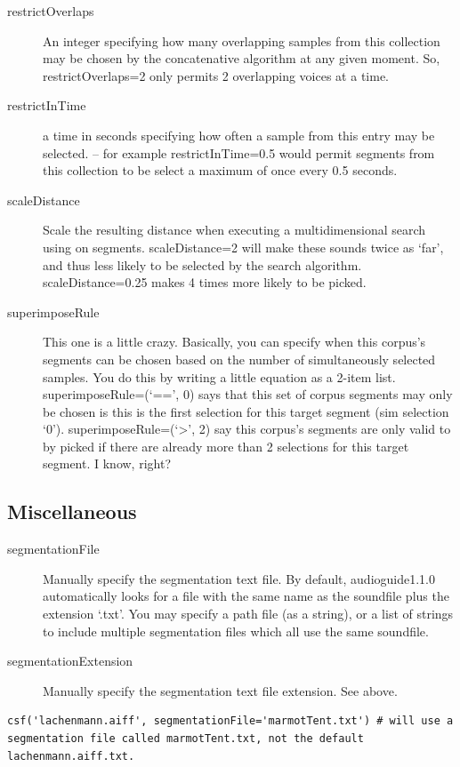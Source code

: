 \documentclass{article}
\newcommand{\ag}{audioguide1.1.0\xspace}
\begin{document}
\begin{spacing}{1.2}
\begin{description}
\item[restrictOverlaps] An integer specifying how many overlapping samples from this collection may be chosen by the concatenative algorithm at any given moment.  So, restrictOverlaps=2 only permits 2 overlapping voices at a time.

\item[restrictInTime] a time in seconds specifying how often a sample from this entry may be selected. -- for example restrictInTime=0.5 would permit segments from this collection to be select a maximum of once every 0.5 seconds.

\item[scaleDistance] Scale the resulting distance when executing a multidimensional search using on segments.  scaleDistance=2 will make these sounds twice as `far', and thus less likely to be selected by the search algorithm.  scaleDistance=0.25 makes 4 times more likely to be picked.

\item[superimposeRule]  This one is a little crazy.  Basically, you can specify when this corpus's segments can be chosen based on the number of simultaneously selected samples.  You do this by writing a little equation as a 2-item list.  superimposeRule=(`==', 0) says that this set of corpus segments may only be chosen is this is the first selection for this target segment (sim selection `0').  superimposeRule=(`>', 2) say this corpus's segments are only valid to by picked if there are already more than 2 selections for this target segment.  I know, right?
\end{description}


\subsection{Miscellaneous}
\begin{description}
\item[segmentationFile] Manually specify the segmentation text file. By default, \ag automatically looks for a file with the same name as the soundfile plus the extension `.txt'. You may specify a path file (as a string), or a list of strings to include multiple segmentation files which all use the same soundfile.

\item[segmentationExtension] Manually specify the segmentation text file extension.  See above.
\end{description}

\begin{lstlisting}
csf('lachenmann.aiff', segmentationFile='marmotTent.txt') # will use a segmentation file called marmotTent.txt, not the default lachenmann.aiff.txt.


\end{lstlisting}
\end{spacing}
\end{document}

